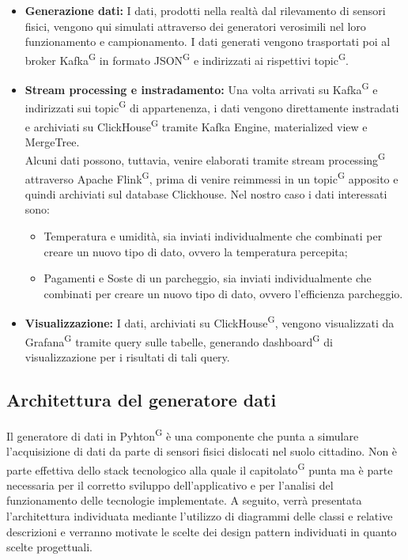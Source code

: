 \documentclass[8pt]{article}
\newcommand{\glossterm}[1]{#1\textsuperscript{G}} %
\begin{document}
\begin{itemize}
	\setlength\itemsep{0em}
    \item \textbf{Generazione dati:} I dati, prodotti nella realtà dal rilevamento di sensori fisici, vengono qui simulati attraverso dei generatori verosimili nel loro funzionamento e campionamento. I dati generati vengono trasportati poi al broker \glossterm{Kafka} in formato \glossterm{JSON} e indirizzati ai rispettivi \glossterm{topic}.
    \item \textbf{Stream processing e instradamento:} Una volta arrivati su \glossterm{Kafka} e indirizzati sui \glossterm{topic} di appartenenza, i dati vengono direttamente instradati e archiviati su \glossterm{ClickHouse} tramite Kafka Engine, materialized view e MergeTree. \\
    Alcuni dati possono, tuttavia, venire elaborati tramite \glossterm{stream processing} attraverso Apache \glossterm{Flink}, prima di venire reimmessi in un \glossterm{topic} apposito e quindi archiviati sul database Clickhouse. Nel nostro caso i dati interessati sono: 
    \begin{itemize}
	\setlength\itemsep{0em}
    	\item Temperatura e umidità, sia inviati individualmente che combinati per creare un nuovo tipo di dato, ovvero la temperatura percepita;
    	\item Pagamenti e Soste di un parcheggio, sia inviati individualmente che combinati per creare un nuovo tipo di dato, ovvero l'efficienza parcheggio.
    \end{itemize}
    \item \textbf{Visualizzazione:} I dati, archiviati su \glossterm{ClickHouse}, vengono visualizzati da \glossterm{Grafana} tramite query sulle tabelle, generando \glossterm{dashboard} di visualizzazione per i risultati di tali query.
\end{itemize}
\clearpage
\subsection{Architettura del generatore dati}
Il generatore di dati in \glossterm{Pyhton} è una componente che punta a simulare l'acquisizione di dati da parte di sensori fisici dislocati nel suolo cittadino. Non è parte effettiva dello stack tecnologico alla quale il \glossterm{capitolato} punta ma è parte necessaria per il corretto sviluppo dell'applicativo e per l'analisi del funzionamento delle tecnologie implementate. A seguito, verrà presentata l’architettura individuata mediante l’utilizzo di diagrammi delle classi e relative descrizioni e verranno motivate le scelte dei design pattern individuati in quanto scelte progettuali.
\end{document}
